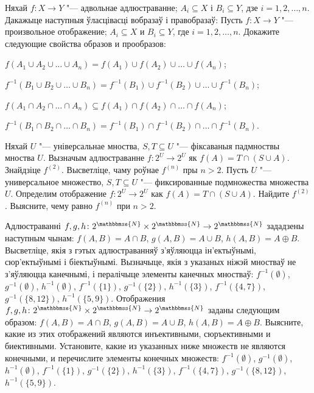 




\begin{problemList}

\problemItemWithCommonPart
{Няхай $f \colon X \to Y$ "--- адвольнае адлюстраванне;
$A_i \subseteq X$ і $B_i \subseteq Y$, дзе $i = 1, 2, \ldots, n$.
Дакажыце наступныя ўласцівасці вобразаў і правобразаў:}
{Пусть $f \colon X \to Y$ "--- произвольное отображение;
$A_i \subseteq X$ и $B_i \subseteq Y$, где $i = 1, 2, \ldots, n$.
Докажите следующие свойства образов и прообразов:}
{%
\begin{belarusianEnumerate}
	\item $f(A_1 \cup A_2 \cup \ldots \cup A_n) = f(A_1) \cup f(A_2) \cup \ldots \cup f(A_n)$;
	\item $f^{-1}(B_1 \cup B_2 \cup \ldots \cup B_n) = f^{-1}(B_1) \cup f^{-1}(B_2) \cup \ldots \cup f^{-1}(B_n)$;
	\item $f(A_1 \cap A_2 \cap \ldots \cap A_n) \subseteq f(A_1) \cap f(A_2) \cap \ldots \cap f(A_n)$;
	\item $f^{-1}(B_1 \cap B_2 \cap \ldots \cap B_n) = f^{-1}(B_1) \cap f^{-1}(B_2) \cap \ldots \cap f^{-1}(B_n)$.
\end{belarusianEnumerate}
}

\smallskip

\problemItemSimple
{Няхай $U$ "--- універсальнае мноства, $S, T \subseteq U$ "--- фіксаваныя падмноствы мноства $U$. Вызначым адлюстраванне $f \colon 2^U \to 2^U$ як $f(A) = T \cap (S \cup A)$. Знайдзіце $f^{(2)}$. Высветліце, чаму роўнае $f^{(n)}$ пры $n > 2$.}
{Пусть $U$ "--- универсальное множество, $S, T \subseteq U$ "--- фиксированные подмножества множества $U$. Определим отображение $f \colon 2^U \to 2^U$ как $f(A) = T \cap (S \cup A)$. Найдите $f^{(2)}$. Выясните, чему равно $f^{(n)}$ при $n > 2$.}

\bigskip

\problemItemSimple
{Адлюстраванні $f, g, h \colon 2^{\mathbbmss{N}} \times 2^{\mathbbmss{N}} \to 2^{\mathbbmss{N}}$ зададзены наступным чынам: $f(A, B) = A \cap B$,
$g(A, B) = A \cup B$, $h(A, B) = A \oplus B$. Высветліце, якія з гэтых адлюстраванняў з'яўляюцца ін'ектыўнымі, сюр'ектыўнымі і біектыўнымі. Вызначыце, якія з указаных ніжэй мностваў не з'яўляюцца канечнымі, і пералічыце элементы канечных мностваў: $f^{-1}(\emptyset)$,
$g^{-1}(\emptyset)$, $h^{-1}(\emptyset)$, $f^{-1}(\{1\})$,
$g^{-1}(\{2\})$, $h^{-1}(\{3\})$, $f^{-1}(\{4, 7\})$,
$g^{-1}(\{8, 12\})$, $h^{-1}(\{5, 9\})$.}
{Отображения $f, g, h \colon 2^{\mathbbmss{N}} \times 2^{\mathbbmss{N}} \to 2^{\mathbbmss{N}}$ заданы следующим образом: $f(A, B) = A \cap B$, $g(A, B) = A \cup B$, $h(A, B) = A \oplus B$. Выясните, какие из этих отображений являются инъективными, сюръективными и биективными. Установите, какие из указанных ниже множеств не являются конечными, и перечислите элементы конечных множеств: $f^{-1}(\emptyset)$,
$g^{-1}(\emptyset)$, $h^{-1}(\emptyset)$, $f^{-1}(\{1\})$,
$g^{-1}(\{2\})$, $h^{-1}(\{3\})$, $f^{-1}(\{4, 7\})$,
$g^{-1}(\{8, 12\})$, $h^{-1}(\{5, 9\})$.}


\end{problemList}
